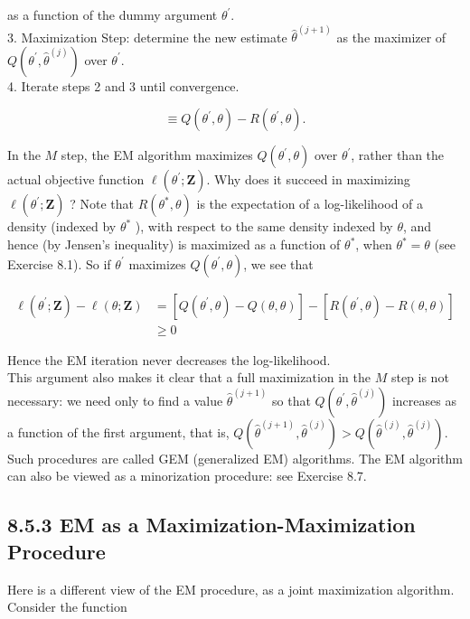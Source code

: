 \documentclass[10pt]{article}
\begin{document}
as a function of the dummy argument $\theta^{\prime}$.\\
3. Maximization Step: determine the new estimate $\hat{\theta}^{(j+1)}$ as the maximizer of $Q\left(\theta^{\prime}, \hat{\theta}^{(j)}\right)$ over $\theta^{\prime}$.\\
4. Iterate steps 2 and 3 until convergence.


\begin{equation*}
\equiv Q\left(\theta^{\prime}, \theta\right)-R\left(\theta^{\prime}, \theta\right) . \tag{8.46}
\end{equation*}


In the $M$ step, the EM algorithm maximizes $Q\left(\theta^{\prime}, \theta\right)$ over $\theta^{\prime}$, rather than the actual objective function $\ell\left(\theta^{\prime} ; \mathbf{Z}\right)$. Why does it succeed in maximizing $\ell\left(\theta^{\prime} ; \mathbf{Z}\right)$ ? Note that $R\left(\theta^{*}, \theta\right)$ is the expectation of a log-likelihood of a density (indexed by $\theta^{*}$ ), with respect to the same density indexed by $\theta$, and hence (by Jensen's inequality) is maximized as a function of $\theta^{*}$, when $\theta^{*}=\theta$ (see Exercise 8.1). So if $\theta^{\prime}$ maximizes $Q\left(\theta^{\prime}, \theta\right)$, we see that


\begin{align*}
\ell\left(\theta^{\prime} ; \mathbf{Z}\right)-\ell(\theta ; \mathbf{Z}) & =\left[Q\left(\theta^{\prime}, \theta\right)-Q(\theta, \theta)\right]-\left[R\left(\theta^{\prime}, \theta\right)-R(\theta, \theta)\right] \\
& \geq 0 \tag{8.47}
\end{align*}


Hence the EM iteration never decreases the log-likelihood.\\
This argument also makes it clear that a full maximization in the $M$ step is not necessary: we need only to find a value $\hat{\theta}^{(j+1)}$ so that $Q\left(\theta^{\prime}, \hat{\theta}^{(j)}\right)$ increases as a function of the first argument, that is, $Q\left(\hat{\theta}^{(j+1)}, \hat{\theta}^{(j)}\right)> Q\left(\hat{\theta}^{(j)}, \hat{\theta}^{(j)}\right)$. Such procedures are called GEM (generalized EM) algorithms. The EM algorithm can also be viewed as a minorization procedure: see Exercise 8.7.

\subsection*{8.5.3 EM as a Maximization-Maximization Procedure}
Here is a different view of the EM procedure, as a joint maximization algorithm. Consider the function
\end{document}
